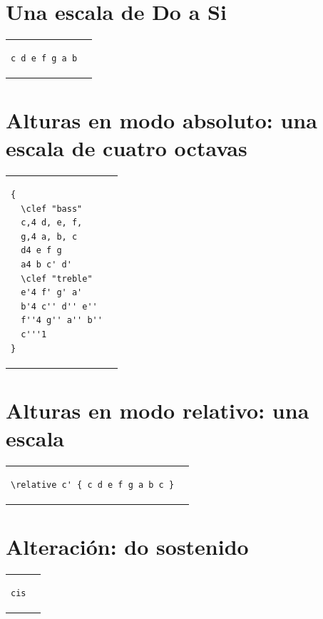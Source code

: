 \documentclass[10pt,a4paper,oneside,headinclude,titlepage]{scrartcl}
\begin{document}
\section*{Una escala de Do a Si}
\begin{tabular}{m{2cm}m{2cm}}
\begin{verbatim}
c d e f g a b
\end{verbatim}
&
\begin[fragment]{lilypond}
c d e f g a b
\end{lilypond}
\end{tabular}

\section*{Alturas en modo absoluto: una escala de cuatro octavas}
\begin{tabular}{m{3cm}m{2cm}}
\begin{verbatim}
{
  \clef "bass"
  c,4 d, e, f,
  g,4 a, b, c 
  d4 e f g
  a4 b c' d'
  \clef "treble"
  e'4 f' g' a'
  b'4 c'' d'' e''
  f''4 g'' a'' b''
  c'''1
}
\end{verbatim}
&
\begin[fragment,staffsize=15,line-width=13\cm]{lilypond}
{
  \clef "bass"
  c,4 d, e, f,
  g,4 a, b, c 
  d4 e f g
  a4 b c' d'
  \clef "treble"
  e'4 f' g' a'
  b'4 c'' d'' e''
  f''4 g'' a'' b''
  c'''1
}
\end{lilypond}
\end{tabular}

\section*{Alturas en modo relativo: una escala}
\begin{tabular}{m{6cm}m{2cm}}
\begin{verbatim}
\relative c' { c d e f g a b c }
\end{verbatim}
&
\begin[fragment]{lilypond}
\relative c' { c d e f g a b c }
\end{lilypond}
\end{tabular}

\section*{Alteración: do sostenido}
\begin{tabular}{m{2cm}m{2cm}}
\begin{verbatim}
cis
\end{verbatim}
&
\begin[fragment,relative=2,notime]{lilypond}
cis
\end{lilypond}
\end{tabular}
\end{document}
